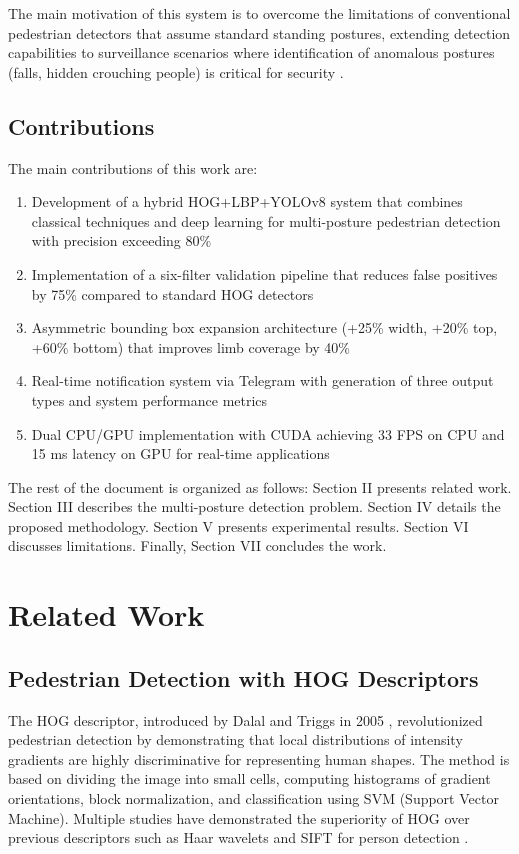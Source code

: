 \documentclass[conference]{IEEEtran}
\begin{document}
The main motivation of this system is to overcome the limitations of conventional pedestrian detectors that assume standard standing postures, extending detection capabilities to surveillance scenarios where identification of anomalous postures (falls, hidden crouching people) is critical for security \cite{vishwakarma2007survey, yu2012survey}.

\subsection{Contributions}

The main contributions of this work are:

\begin{enumerate}
    \item Development of a hybrid HOG+LBP+YOLOv8 system that combines classical techniques and deep learning for multi-posture pedestrian detection with precision exceeding 80\%
    \item Implementation of a six-filter validation pipeline that reduces false positives by 75\% compared to standard HOG detectors
    \item Asymmetric bounding box expansion architecture (+25\% width, +20\% top, +60\% bottom) that improves limb coverage by 40\%
    \item Real-time notification system via Telegram with generation of three output types and system performance metrics
    \item Dual CPU/GPU implementation with CUDA achieving 33 FPS on CPU and 15 ms latency on GPU for real-time applications
\end{enumerate}

The rest of the document is organized as follows: Section II presents related work. Section III describes the multi-posture detection problem. Section IV details the proposed methodology. Section V presents experimental results. Section VI discusses limitations. Finally, Section VII concludes the work.

\section{Related Work}

\subsection{Pedestrian Detection with HOG Descriptors}

The HOG descriptor, introduced by Dalal and Triggs in 2005 \cite{dalal2005histograms}, revolutionized pedestrian detection by demonstrating that local distributions of intensity gradients are highly discriminative for representing human shapes. The method is based on dividing the image into small cells, computing histograms of gradient orientations, block normalization, and classification using SVM (Support Vector Machine). Multiple studies have demonstrated the superiority of HOG over previous descriptors such as Haar wavelets and SIFT for person detection \cite{dollar2012pedestrian, enzweiler2009monocular}.
\end{document}
